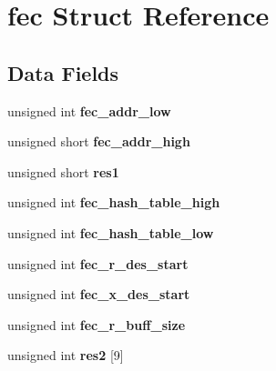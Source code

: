 \hypertarget{structfec}{}\section{fec Struct Reference}
\label{structfec}
\subsection*{Data Fields}
\begin{DoxyCompactItemize}
\item 
\mbox{\label{structfec_a9d27891e0da9e09df97596d85d586b33}} 
unsigned int {\bfseries fec\+\_\+addr\+\_\+low}
\item 
\mbox{\label{structfec_ab9ff2ccf1aeea4b37d610bab4d31b05a}} 
unsigned short {\bfseries fec\+\_\+addr\+\_\+high}
\item 
\mbox{\label{structfec_a3fc7bed9ab5ad6f4e50cfee920ef439b}} 
unsigned short {\bfseries res1}
\item 
\mbox{\label{structfec_a70b57c0f7f709bd8dd1ce725edc33530}} 
unsigned int {\bfseries fec\+\_\+hash\+\_\+table\+\_\+high}
\item 
\mbox{\label{structfec_a315445955bd490338e3e99926659f004}} 
unsigned int {\bfseries fec\+\_\+hash\+\_\+table\+\_\+low}
\item 
\mbox{\label{structfec_a82fc92cd444e5843700ca43a1a1092c1}} 
unsigned int {\bfseries fec\+\_\+r\+\_\+des\+\_\+start}
\item 
\mbox{\label{structfec_a7ed669b2755187a9b49c7ebb324a5933}} 
unsigned int {\bfseries fec\+\_\+x\+\_\+des\+\_\+start}
\item 
\mbox{\label{structfec_ac56c08a4ac3cd2c3926c81221bbc068d}} 
unsigned int {\bfseries fec\+\_\+r\+\_\+buff\+\_\+size}
\item 
\mbox{\label{structfec_a1366797fb6b907e7cf107d43908d80a3}} 
unsigned int {\bfseries res2} \mbox{[}9\mbox{]}
\item 
\mbox{\label{structfec_a9cfe28f9a9c91099ff8b6e9e47fffa82}} 

\end{DoxyCompactItemize}
